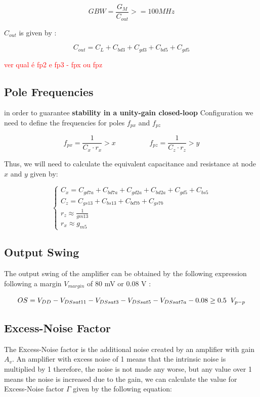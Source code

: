 $$  GBW = \frac{G_M}{C_{out}} >= 100 MHz $$

$C_{out}$ is given by :

$$C_{out} = C_L + C_{bd3} + C_{gd3} + C_{bd5} + C_{gd5}$$

\newpage

\textcolor{red}{ver qual é fp2 e fp3 - fpx ou fpz }

\subsection{Pole Frequencies}
in order to guarantee \textbf{stability in a unity-gain closed-loop} Configuration we need to define the frequencies
for poles $f_{px}$ and  $f_{pz}$

$$f_{px} = \frac{1}{C_x\cdot r_x} > x  \hspace{2cm}  f_{pz} = \frac{1}{C_z\cdot r_z} > y$$

Thus, we will need to calculate the equivalent capacitance and resistance at node $x$ and $y$ given by:

\begin{equation}
    \begin{cases}
        C_x = C_{gd7a} + C_{bd7a}+ C_{gd2a} + C_{bd2a} + C_{gd5} + C_{bs5}\\
        C_z = C_{gs13} + C_{bs13} + C_{bd7b}+ C_{gs7b} \\
        r_z \approx \frac{1}{gm13} \\
        r_x \approx g_{m5} 
    \end{cases}
\end{equation}

\subsection{Output Swing}
The output swing of the amplifier can be obtained by the following expression following a margin $V_{margin}$ of 80 mV or 0.08 V :

$$OS = V_{DD} - V_{DSsat11} - V_{DSsat3} - V_{DSsat5} - V_{DSsat7a} - 0.08  \geq  0.5 \hspace{0.2cm} V_{p-p}$$

\subsection{Excess-Noise Factor}
The Excess-Noise factor is the additional noise created by an amplifier with gain $A_v$. An amplifier with excess noise of 1 means that the intrinsic noise is multiplied by 1 therefore, the noise is not made any worse, but any value over 1 means the noise is increased due to the gain, we can calculate the value for Excess-Noise factor $\Gamma$ given by the following equation:

